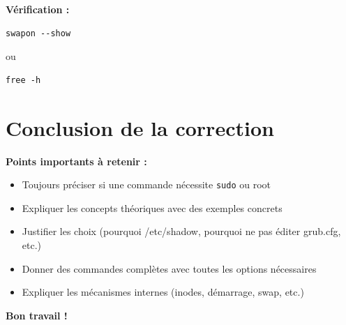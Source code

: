 \documentclass[12pt,a4paper]{article}
\begin{document}
\begin{answerbox}
\begin{enumerate}
    \textbf{Vérification :}
    \begin{lstlisting}
swapon --show
    \end{lstlisting}
    
    ou
    
    \begin{lstlisting}
free -h
    \end{lstlisting}
\end{enumerate}
\end{answerbox}

\newpage

\section*{Conclusion de la correction}

\textbf{Points importants à retenir :}
\begin{itemize}
    \item Toujours préciser si une commande nécessite \texttt{sudo} ou root
    \item Expliquer les concepts théoriques avec des exemples concrets
    \item Justifier les choix (pourquoi /etc/shadow, pourquoi ne pas éditer grub.cfg, etc.)
    \item Donner des commandes complètes avec toutes les options nécessaires
    \item Expliquer les mécanismes internes (inodes, démarrage, swap, etc.)
\end{itemize}

\textbf{Bon travail !}
\end{document}
